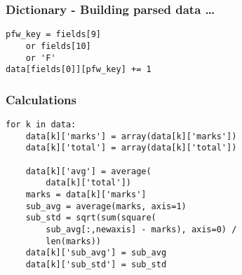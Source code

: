\documentclass[14pt,compress]{beamer}
\begin{document}
\begin{frame}[fragile]
  \frametitle{Dictionary - Building parsed data \ldots}
  \begin{lstlisting}
pfw_key = fields[9]
    or fields[10]
    or 'F'
data[fields[0]][pfw_key] += 1
  \end{lstlisting}
\end{frame}

\begin{frame}[fragile]
  \frametitle{Calculations}
  \small
  \begin{lstlisting}
for k in data:
    data[k]['marks'] = array(data[k]['marks'])
    data[k]['total'] = array(data[k]['total'])

    data[k]['avg'] = average(
        data[k]['total'])
    marks = data[k]['marks']
    sub_avg = average(marks, axis=1)
    sub_std = sqrt(sum(square(
        sub_avg[:,newaxis] - marks), axis=0) /
        len(marks))
    data[k]['sub_avg'] = sub_avg
    data[k]['sub_std'] = sub_std
  \end{lstlisting}
\end{frame}
\end{document}
